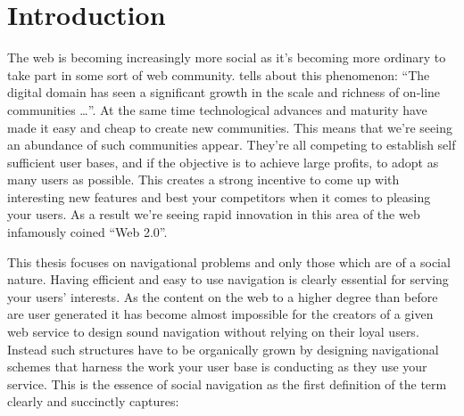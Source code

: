 \chapter{Introduction}

%
%

The web is becoming increasingly more social as it's becoming more ordinary to
take part in some sort of web community. 
\citet[p.~44]{backstrom06} tells about this phenomenon:
``The digital domain has seen a significant growth in the scale and richness
of on-line communities \ldots''. At the same time technological
advances and maturity have made it easy and cheap to create new communities.
This means that we're seeing an abundance of such communities appear.
They're all competing to establish self sufficient user bases, and if the
objective is to achieve large profits, to adopt as many users
as possible. This creates a strong incentive to come up with interesting new
features and best your competitors when it comes to pleasing your users.
As a result we're seeing rapid innovation in this area of the web infamously
coined ``Web 2.0''.%
%

This thesis focuses on navigational problems and only those which are of a
social nature. Having efficient and easy to use navigation is clearly
essential for serving your users' interests. As the content on the web to a
higher degree than before are user generated it has become almost impossible
for the creators of a given web service to design sound navigation without
relying on their loyal users. Instead such structures have to be organically
grown by designing navigational schemes that harness the work your user base
is conducting as they use your service. This is the essence of social
navigation as the first definition of the term clearly and succinctly
captures:

